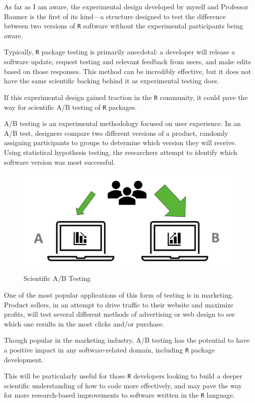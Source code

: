\documentclass[12pt,twoside]{reedthesis}
\begin{document}
As far as I am aware, the experimental design developed by myself and Professor Baumer is the first of its kind---a structure designed to test the difference between two versions of \texttt{R} software without the experimental participants being aware.

Typically, \texttt{R} package testing is primarily anecdotal: a developer will release a software update, request testing and relevant feedback from users, and make edits based on those responses. This method can be incredibly effective, but it does not have the same scientific backing behind it as experimental testing does.

If this experimental design gained traction in the \texttt{R} community, it could pave the way for scientific A/B testing of \texttt{R} packages.

A/B testing is an experimental methodology focused on user experience. In an A/B test, designers compare two different versions of a product, randomly assigning participants to groups to determine which version they will receive. Using statistical hypothesis testing, the researchers attempt to identify which software version was most successful.
\begin{figure}
\includegraphics[width=1\linewidth]{figure/a-b_testing} \caption{Scientific A/B Testing}\label{fig:unnamed-chunk-85}
\end{figure}
One of the most popular applications of this form of testing is in marketing. Product sellers, in an attempt to drive traffic to their website and maximize profits, will test several different methods of advertising or web design to see which one results in the most clicks and/or purchase.

Though popular in the marketing industry, A/B testing has the potential to have a positive impact in any software-related domain, including \texttt{R} package development.

This will be particularly useful for those \texttt{R} developers looking to build a deeper scientific understanding of how to code more effectively, and may pave the way for more research-based improvements to software written in the \texttt{R} language.
\end{document}
